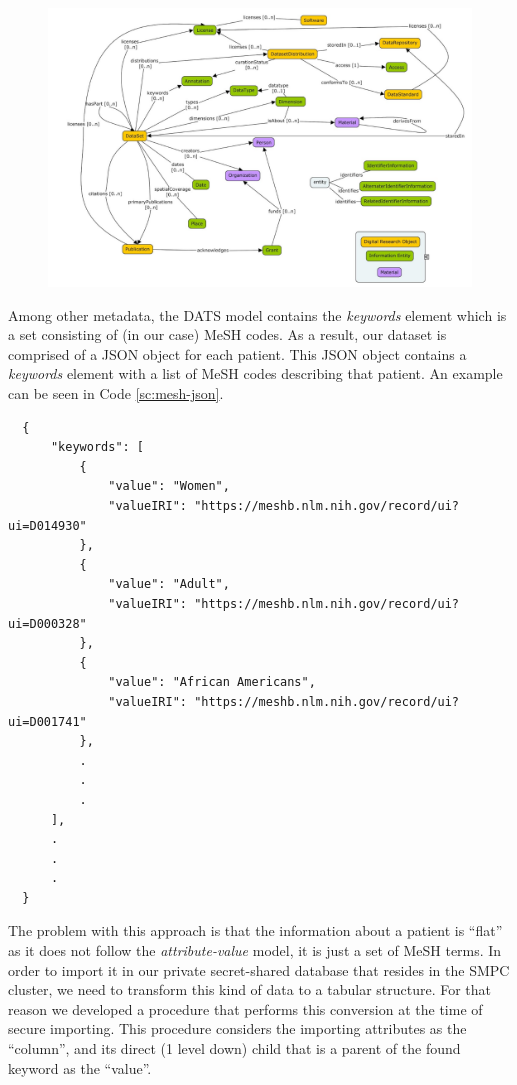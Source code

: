 \begin{figure}[H]
  \centering
  \includegraphics[width=\columnwidth]{figures/dats.png}
  \label{f:dats}
\end{figure}

Among other metadata, the DATS model contains the \textit{keywords} element which is a set consisting of (in our case) MeSH codes.
As a result, our dataset is comprised of a JSON object for each patient.
This JSON object contains a \textit{keywords} element with a list of MeSH codes describing that patient.
An example can be seen in Code \ref{sc:mesh-json}.


{
\begin{verbatim}
  {
      "keywords": [
          {
              "value": "Women",
              "valueIRI": "https://meshb.nlm.nih.gov/record/ui?ui=D014930"
          },
          {
              "value": "Adult",
              "valueIRI": "https://meshb.nlm.nih.gov/record/ui?ui=D000328"
          },
          {
              "value": "African Americans",
              "valueIRI": "https://meshb.nlm.nih.gov/record/ui?ui=D001741"
          },
          .
          .
          .
      ],
      .
      .
      .
  }
\end{verbatim}
\label{sc:mesh-json}
}

The problem with this approach is that the information about a patient is ``flat'' as it does not follow the \textit{attribute\hyp value} model, it is just a set of MeSH terms.
In order to import it in our private secret\hyp shared database that resides in the SMPC cluster, we need to transform this kind of data to a tabular structure.
For that reason we developed a procedure that performs this conversion at the time of secure importing.
This procedure considers the importing attributes as the ``column'', and its direct (1 level down) child that is a parent of the found keyword as the ``value''.

